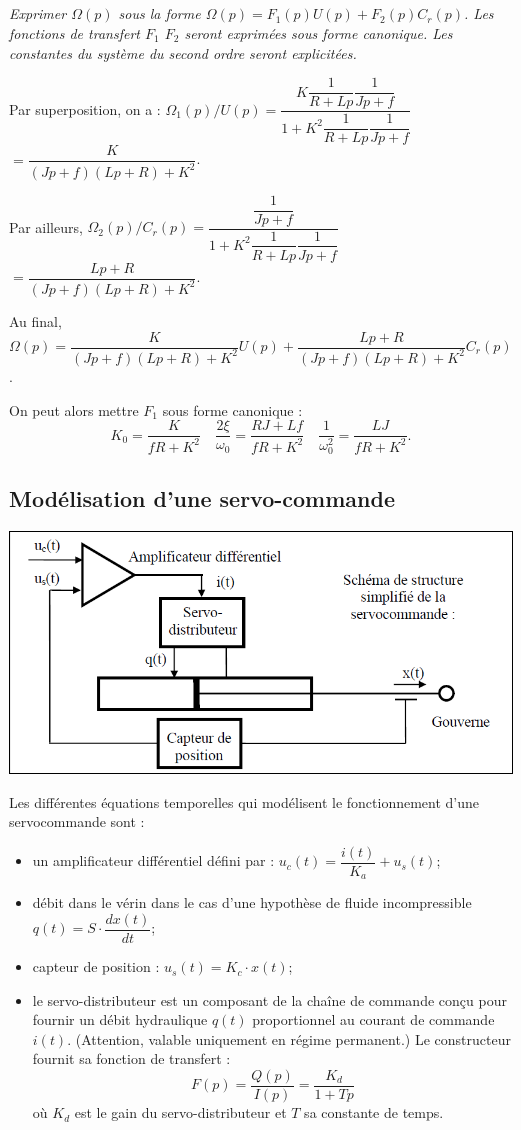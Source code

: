 \documentclass[10pt,fleqn]{article} %
\begin{document}
\begin{multicols}{2}
\subparagraph{}
\textit{Exprimer $\Omega(p)$ sous la forme  $\Omega(p)=F_1(p)U(p) + F_2(p) C_r(p)$. Les fonctions de transfert $F_1$ $F_2$ seront exprimées sous forme canonique. Les constantes du système du second ordre seront explicitées.}
\ifprof
\begin{corrige}
Par superposition, on a : 
$\Omega_1(p)/U(p)=\dfrac{K\dfrac{1}{R+Lp}\dfrac{1}{Jp+f}}{1+K^2\dfrac{1}{R+Lp}\dfrac{1}{Jp+f}}$
$=\dfrac{K}{\left(Jp+f\right)\left(Lp+R\right)+K^2}$.

Par ailleurs, $\Omega_2(p)/C_r(p)=\dfrac{\dfrac{1}{Jp+f}}{1+K^2\dfrac{1}{R+Lp}\dfrac{1}{Jp+f}}$
$=\dfrac{Lp+R}{\left(Jp+f\right)\left(Lp+R\right)+K^2}$.


Au final, $\Omega(p)=\dfrac{K}{\left(Jp+f\right)\left(Lp+R\right)+K^2} U(p) + \dfrac{Lp+R}{\left(Jp+f\right)\left(Lp+R\right)+K^2} C_r(p)$. 

On peut alors mettre $F_1$ sous forme canonique : 
$$
K_0 =\dfrac{K}{fR+K^2}
\quad 
\dfrac{2\xi}{\omega_0} = \dfrac{RJ+Lf}{fR+K^2}
\quad
\dfrac{1}{\omega_0^2} =  \dfrac{LJ}{fR+K^2}.
$$
\end{corrige}
\else
\fi


\subsection*{Modélisation d'une servo-commande}

\setcounter{exo}{0}
\begin{center}
\includegraphics[width=.9\linewidth]{images/img5}
\end{center}

Les différentes équations temporelles qui modélisent le fonctionnement d'une servocommande sont :
\begin{itemize}
\item un amplificateur différentiel défini par : $u_c(t)=\dfrac{i(t)}{K_a}+u_s(t)$;
\item débit dans le vérin dans le cas d'une hypothèse de fluide incompressible $q(t)=S\cdot\dfrac{dx(t)}{dt}$;
\item capteur de position : $u_s(t)=K_c\cdot x(t)$;
\item le servo-distributeur est un composant de la chaîne de commande conçu pour fournir un débit hydraulique $q(t)$ proportionnel au courant de commande $i(t)$. (Attention, valable uniquement en régime permanent.) Le constructeur fournit sa fonction de transfert :
$$
F(p)=\dfrac{Q(p)}{I(p)}=\dfrac{K_d}{1+Tp}
$$
où $K_d$ est le gain du servo-distributeur et $T$ sa constante de temps.
\end{itemize}


\end{multicols}
\end{document}
